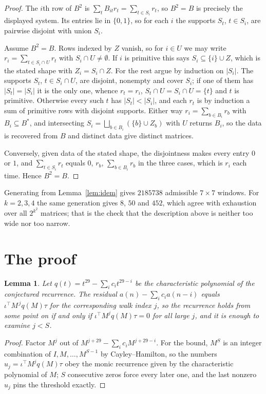 \documentclass[11pt,a4paper]{article}
\theoremstyle{plain}
\newtheorem{lemma}[theorem]{Lemma}
\theoremstyle{definition}
\begin{document}
\begin{proof}
The $i$th row of $B^2$ is $\sum_t B_{it}r_t=\sum_{t\in S_i}r_t$, so $B^2=B$ is precisely the
displayed system. Its entries lie in $\{0,1\}$, so for each $i$ the supports $S_t$,
$t\in S_i$, are pairwise disjoint with union $S_i$.

Assume $B^2=B$. Rows indexed by $Z$ vanish, so for $i\in U$ we may write
$r_i=\sum_{t\in S_i\cap U}r_t$ with $S_i\cap U\neq\emptyset$. If $i$ is primitive this says
$S_i\subseteq\{i\}\cup Z$, which is the stated shape with $Z_i=S_i\cap Z$. For the rest argue
by induction on $|S_i|$. The supports $S_t$, $t\in S_i\cap U$, are disjoint, nonempty and
cover $S_i$; if one of them has $|S_t|=|S_i|$ it is the only one, whence $r_t=r_i$,
$S_t\cap U=S_i\cap U=\{t\}$ and $t$ is primitive. Otherwise every such $t$ has
$|S_t|<|S_i|$, and each $r_t$ is by induction a sum of primitive rows with disjoint supports.
Either way $r_i=\sum_{b\in B_i}r_b$ with $B_i\subseteq B^{\ast}$, and intersecting
$S_i=\bigsqcup_{b\in B_i}(\{b\}\cup Z_b)$ with $U$ returns $B_i$, so the data is recovered
from $B$ and distinct data give distinct matrices.

Conversely, given data of the stated shape, the disjointness makes every entry $0$ or $1$, and
$\sum_{t\in S_i}r_t$ equals $0$, $r_b$, $\sum_{b\in B_i}r_b$ in the three cases, which is
$r_i$ each time. Hence $B^2=B$.
\end{proof}

Generating from Lemma~\ref{lem:idem} gives $2185738$ admissible $7\times7$ windows. For
$k=2,3,4$ the same generation gives $8$, $50$ and $452$, which agree with exhaustion over all
$2^{k^2}$ matrices; that is the check that the description above is neither too wide nor too
narrow.

\section{The proof}

\begin{lemma}\label{lem:crit}
Let $q(t)=t^{29}-\sum_i c_it^{29-i}$ be the characteristic polynomial of the
conjectured recurrence. The residual $a(n)-\sum_ic_ia(n-i)$ equals
$\iota^{\!\top}M^{\,j}q(M)\tau$ for the corresponding walk index $j$, so the recurrence
holds from some point on if and only if $\iota^{\!\top}M^{j}q(M)\tau=0$ for all large $j$,
and it is enough to examine $j<S$.
\end{lemma}

\begin{proof}
Factor $M^{j}$ out of $M^{j+29}-\sum_ic_iM^{j+29-i}$. For the bound, $M^{S}$
is an integer combination of $I,M,\dots,M^{S-1}$ by Cayley--Hamilton, so the numbers
$u_j=\iota^{\!\top}M^{j}q(M)\tau$ obey the monic recurrence given by the characteristic
polynomial of $M$; $S$ consecutive zeros force every later one, and the last nonzero $u_j$
pins the threshold exactly.
\end{proof}
\end{document}

